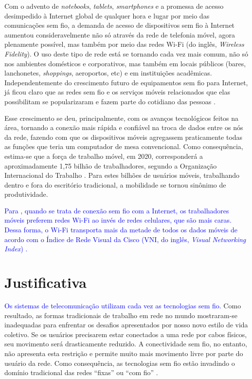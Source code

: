 Com o advento de \textit{notebooks}, \textit{tablets}, \textit{smartphones} e a promessa de acesso desimpedido à Internet global de qualquer hora e lugar por meio das comunicações sem fio, a demanda de acesso de dispositivos sem fio à Internet aumentou consideravelmente não só através da rede de telefonia móvel, agora plenamente possível, mas também por meio das redes Wi-Fi (do inglês, \textit{Wireless Fidelity}). O uso deste tipo de rede está se tornando cada vez mais comum, não só nos ambientes domésticos e corporativos, mas também em locais públicos (bares, lanchonetes, \textit{shoppings}, aeroportos, etc) e em instituições acadêmicas. Independentemente do crescimento futuro de equipamentos sem fio para Internet, já ficou claro que as redes sem fio e os serviços móveis relacionados que elas possibilitam se popularizaram e fazem parte do cotidiano das pessoas \cite{gast2002,kurose2013}.

Esse crescimento se deu, principalmente, com os avanços tecnológicos feitos na área, tornando a conexão mais rápida e confiável na troca de dados entre os nós da rede, fazendo com que os dispositivos móveis agregassem praticamente todas as funções que teria um computador de mesa convencional. Como consequência, estima-se que a força de trabalho móvel, em 2020, corresponderá a aproximadamente 1,75 bilhão de trabalhadores, segundo a Organização Internacional do Trabalho \cite{wba2017}. Para estes bilhões de usuários móveis, trabalhando dentro e fora do escritório tradicional, a mobilidade se tornou sinônimo de produtividade.

\textcolor{blue}{Para \cite{wba2017}, quando se trata de conexão sem fio com a Internet, os trabalhadores móveis preferem redes Wi-Fi ao invés de redes celulares, que são mais caras. Dessa forma, o Wi-Fi transporta mais da metade de todos os dados móveis de acordo com o Índice de Rede Visual da Cisco (VNI, do inglês, \textit{Visual Networking Index}) \cite{wba2017}.}

\section{Justificativa}
\label{sec:justificativa}

\textcolor{blue}{Os sistemas de telecomunicação utilizam cada vez as tecnologias sem fio.} Como resultado, as formas tradicionais de trabalho em rede no mundo mostraram-se inadequadas para enfrentar os desafios apresentados por nosso novo estilo de vida coletivo. Se os usuários precisarem estar conectados a uma rede por cabos físicos, seu movimento será drasticamente reduzido. A conectividade sem fio, no entanto, não apresenta esta restrição e permite muito mais movimento livre por parte do usuário da rede. Como consequência, as tecnologias sem fio estão invadindo o domínio tradicional das redes ``fixas'' ou ``com fio'' \cite{gast2002}.

